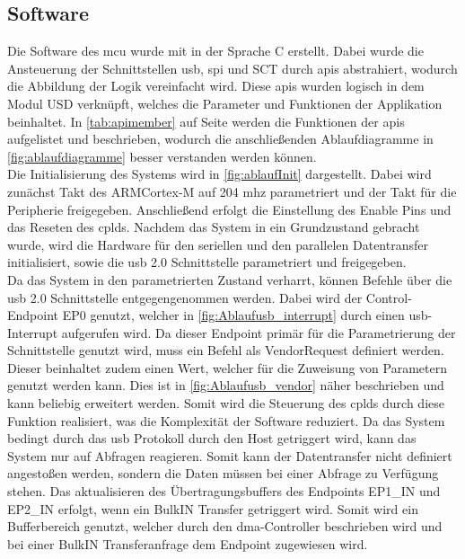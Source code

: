 \subsection{Software}
Die Software des \ac{mcu} wurde mit  in der Sprache C erstellt. Dabei wurde die Ansteuerung der Schnittstellen \ac{usb}, \ac{spi} und SCT durch \ac{api}s abstrahiert, wodurch die Abbildung der Logik vereinfacht wird. Diese \ac{api}s wurden logisch in dem Modul USD verknüpft, welches die Parameter und Funktionen der Applikation beinhaltet. In \autoref{tab:apimember} auf Seite \pageref{tab:apimember} werden die Funktionen der \ac{api}s aufgelistet und beschrieben, wodurch die anschließenden Ablaufdiagramme in \autoref{fig:ablaufdiagramme} besser verstanden werden können.\\
Die Initialisierung des Systems wird in \autoref{fig:ablaufInit} dargestellt. Dabei wird zunächst Takt des ARM\SymbReg Cortex\SymbReg-M auf 204 \ac{mhz} parametriert und der Takt für die Peripherie freigegeben. Anschließend erfolgt die Einstellung des Enable Pins und das Reseten des \ac{cpld}s. Nachdem das System in ein Grundzustand gebracht wurde, wird die Hardware für den seriellen und den parallelen Datentransfer initialisiert, sowie die \ac{usb} 2.0 Schnittstelle parametriert und freigegeben.\\
Da das System in den parametrierten Zustand verharrt, können Befehle über die \ac{usb} 2.0 Schnittstelle entgegengenommen werden. Dabei wird der Control-Endpoint EP0 genutzt, welcher in \autoref{fig:Ablaufusb_interrupt} durch einen \ac{usb}-Interrupt aufgerufen wird. Da dieser Endpoint primär für die Parametrierung der Schnittstelle genutzt wird, muss ein Befehl als VendorRequest definiert werden. Dieser beinhaltet zudem einen Wert, welcher für die Zuweisung von Parametern genutzt werden kann. Dies ist in \autoref{fig:Ablaufusb_vendor} näher beschrieben und kann beliebig erweitert werden. Somit wird die Steuerung des \ac{cpld}s durch diese Funktion realisiert, was die Komplexität der Software reduziert. Da das System bedingt durch das \ac{usb} Protokoll durch den Host getriggert wird, kann das System nur auf Abfragen reagieren. Somit kann der Datentransfer nicht definiert angestoßen werden, sondern die Daten müssen bei einer Abfrage zu Verfügung stehen. Das aktualisieren des Übertragungsbuffers des Endpoints EP1\_IN und EP2\_IN erfolgt, wenn ein BulkIN Transfer getriggert wird. Somit wird ein Bufferbereich genutzt, welcher durch den \ac{dma}-Controller beschrieben wird und bei einer BulkIN Transferanfrage dem Endpoint zugewiesen wird.\\
